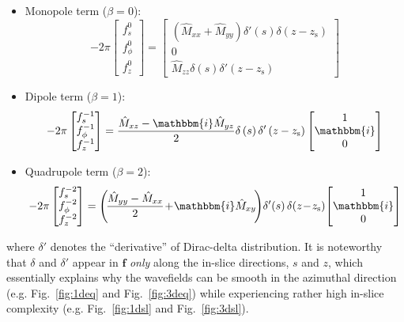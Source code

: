 \documentclass[extra]{gji}
\begin{document}
\begin{itemize}
  \item Monopole term ($\beta=0$):
  \begin{equation} 
    -2\pi 
    \begin{bmatrix}
      f_s^0\\f_\phi^0\\f_z^0
    \end{bmatrix}
    =
    \begin{bmatrix}
      \left(\hat{M}_{xx}+\hat{M}_{yy}\right)\delta'\left(s\right)\delta\left(z-z_\text{s}\right)\\
      0\\
      \hat{M}_{zz}\delta\left(s\right)\delta'\left(z-z_\text{s}\right)
    \end{bmatrix}
    \label{eq:fmono}
  \end{equation}
  \item Dipole term ($\beta=1$):
  \begin{equation} 
    -2\pi 
    \begin{bmatrix}
      f_s^{-1}\\f_\phi^{-1}\\f_z^{-1}
    \end{bmatrix}
    =
    \frac{\hat{M}_{xz}-\mathbbm{i}\hat{M}_{yz}}{2}
    \delta\left(s\right)\delta'\left(z-z_\text{s}\right)
    \begin{bmatrix}
      1\\\mathbbm{i}\\0
    \end{bmatrix}
    \label{eq:fdi}
  \end{equation}
  \item Quadrupole term ($\beta=2$):
  \begin{equation} 
    -2\pi 
    \begin{bmatrix}
       f_s^{-2}\\f_\phi^{-2}\\f_z^{-2}
    \end{bmatrix}
    =
    \left(\!\frac{\hat{M}_{yy}-\hat{M}_{xx}}{2}\!+\!\mathbbm{i}\hat{M}_{xy}\!\right)
    \!\delta'\!\left(s\right) \delta\!\left(z\!-\!z_\text{s}\right)
    \!\begin{bmatrix}
      1\\\mathbbm{i}\\0
    \end{bmatrix}
    \label{eq:fquad}
  \end{equation}
\end{itemize}
where $\delta'$ denotes the ``derivative'' of Dirac-delta distribution. 
It is noteworthy that $\delta$ and $\delta'$ appear in $\mathbf{f}$ 
\textit{only} along the in-slice directions, $s$ and $z$, 
which essentially explains why the wavefields can be smooth in the 
azimuthal direction (e.g. Fig.~\ref{fig:1deq} and Fig.~\ref{fig:3deq})
while experiencing rather high in-slice complexity
(e.g. Fig.~\ref{fig:1dsl} and Fig.~\ref{fig:3dsl}). 
\end{document}
